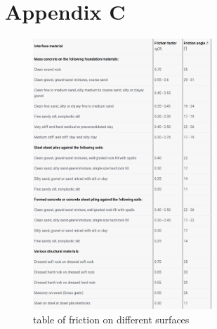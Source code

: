 \chapter{Appendix C}
\begin{figure}[h!]
    \centering
    \includegraphics[width=0.6\textwidth]{figures/soilfriction.png}
    \caption{table of friction on different surfaces\cite{soilfrition}} 
    \label{fig:friction} 
\end{figure}